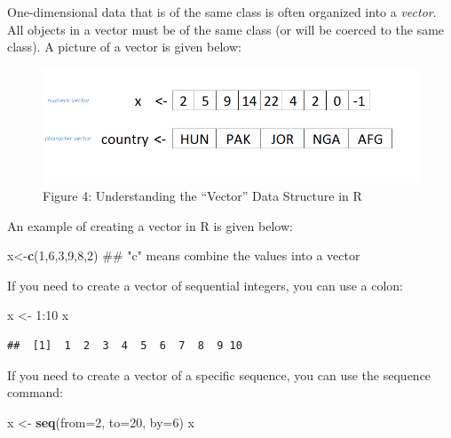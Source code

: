 \documentclass[]{book}
\newenvironment{Shaded}{\begin{snugshade}}{\end{snugshade}}
\newcommand{\KeywordTok}[1]{\textcolor[rgb]{0.13,0.29,0.53}{\textbf{{#1}}}}
\newcommand{\DataTypeTok}[1]{\textcolor[rgb]{0.13,0.29,0.53}{{#1}}}
\newcommand{\DecValTok}[1]{\textcolor[rgb]{0.00,0.00,0.81}{{#1}}}
\newcommand{\StringTok}[1]{\textcolor[rgb]{0.31,0.60,0.02}{{#1}}}
\newcommand{\NormalTok}[1]{{#1}}
\begin{document}
One-dimensional data that is of the same class is often organized into a
\emph{vector}. All objects in a vector must be of the same class (or
will be coerced to the same class). A picture of a vector is given
below:

\begin{figure}[htbp]
\centering
\includegraphics{vector.PNG}
\caption{Figure 4: Understanding the ``Vector'' Data Structure in R}
\end{figure}

An example of creating a vector in R is given below:

\begin{Shaded}
\begin{Highlighting}[]
\NormalTok{x<-}\KeywordTok{c}\NormalTok{(}\DecValTok{1}\NormalTok{,}\DecValTok{6}\NormalTok{,}\DecValTok{3}\NormalTok{,}\DecValTok{9}\NormalTok{,}\DecValTok{8}\NormalTok{,}\DecValTok{2}\NormalTok{)    ## "c" means combine the values into a vector}
\end{Highlighting}
\end{Shaded}

If you need to create a vector of sequential integers, you can use a
colon:

\begin{Shaded}
\begin{Highlighting}[]
\NormalTok{x <-}\StringTok{ }\DecValTok{1}\NormalTok{:}\DecValTok{10}
\NormalTok{x}
\end{Highlighting}
\end{Shaded}

\begin{verbatim}
##  [1]  1  2  3  4  5  6  7  8  9 10
\end{verbatim}

If you need to create a vector of a specific sequence, you can use the
sequence command:

\begin{Shaded}
\begin{Highlighting}[]
\NormalTok{x <-}\StringTok{ }\KeywordTok{seq}\NormalTok{(}\DataTypeTok{from=}\DecValTok{2}\NormalTok{, }\DataTypeTok{to=}\DecValTok{20}\NormalTok{, }\DataTypeTok{by=}\DecValTok{6}\NormalTok{)}
\NormalTok{x}
\end{Highlighting}
\end{Shaded}
\end{document}

